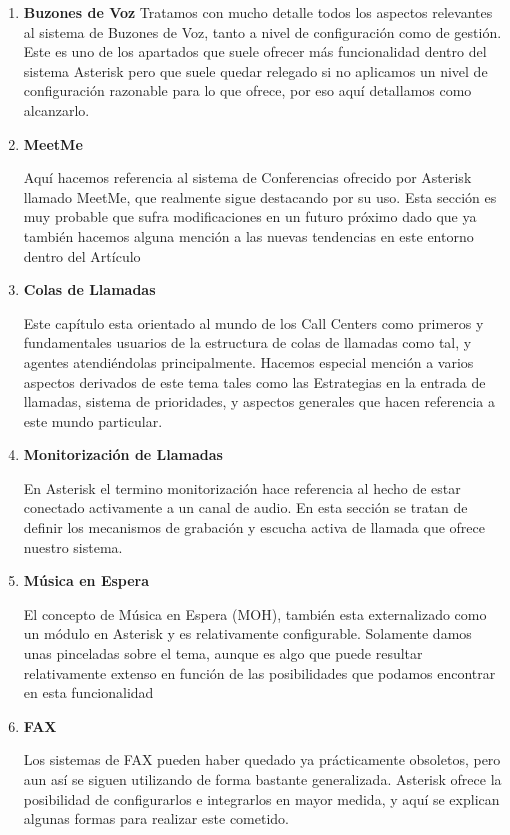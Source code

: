 \begin{enumerate}
	  \setlength{\itemsep}{10pt}

	\item \textbf{Buzones de Voz}
	Tratamos con mucho detalle todos los aspectos relevantes al sistema de Buzones de Voz, tanto a nivel de configuración como de gestión. Este es uno de los apartados que suele ofrecer más funcionalidad dentro del sistema Asterisk pero que suele quedar relegado si no aplicamos un nivel de configuración razonable para lo que ofrece, por eso aquí detallamos como alcanzarlo.
	
	\item \textbf{MeetMe}
	
	Aquí hacemos referencia al sistema de Conferencias ofrecido por Asterisk llamado MeetMe, que realmente sigue destacando por su uso. Esta sección es muy probable que sufra modificaciones en un futuro próximo dado que ya también hacemos alguna mención a las nuevas tendencias en este entorno dentro del Artículo
	
	\item \textbf{Colas de Llamadas}
	
	Este capítulo esta orientado al mundo de los Call Centers como primeros y fundamentales usuarios de la estructura de colas de llamadas como tal, y agentes atendiéndolas principalmente. Hacemos especial mención a varios aspectos derivados de este tema tales como las Estrategias en la entrada de llamadas, sistema de prioridades, y aspectos generales que hacen referencia a este mundo particular.
	
	\item \textbf{Monitorización de Llamadas}
	
	En Asterisk el termino monitorización hace referencia al hecho de estar conectado activamente a un canal de audio. En esta sección se tratan de definir los mecanismos de grabación y escucha activa de llamada que ofrece nuestro sistema.
	
  \item \textbf{Música en Espera}
	
	El concepto de Música en Espera (MOH), también esta externalizado como un módulo en Asterisk y es relativamente configurable. Solamente damos unas pinceladas sobre el tema, aunque es algo que puede resultar relativamente extenso en función de las posibilidades que podamos encontrar en esta funcionalidad
	
	\item \textbf{FAX}
	
	Los sistemas de FAX pueden haber quedado ya prácticamente obsoletos, pero aun así se siguen utilizando de forma bastante generalizada. Asterisk ofrece la posibilidad de configurarlos e integrarlos en mayor  medida, y aquí se explican algunas formas para realizar este cometido.
	

\end{enumerate}
